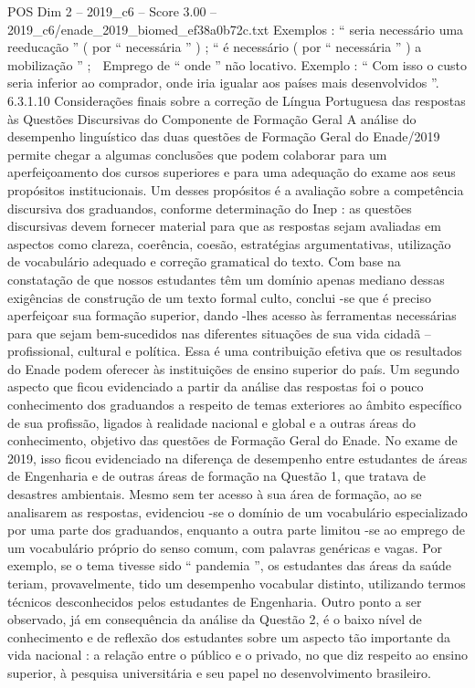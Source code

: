 \begin{textsample}{POS Dim 2 – 2019\_c6 – Score 3.00 – 2019\_c6/enade\_2019\_biomed\_ef38a0b72c.txt}
Exemplos : “ seria necessário uma reeducação ” ( por “ necessária ” ) ; “ é necessário ( por “ necessária ” ) a mobilização ” ;  Emprego de “ onde ” não locativo.
Exemplo : “ Com isso o custo seria inferior ao comprador, onde iria igualar aos países mais desenvolvidos ”. 6.3.1.10 Considerações finais sobre a correção de Língua Portuguesa das respostas às Questões Discursivas do Componente de Formação Geral A análise do desempenho linguístico das duas questões de Formação Geral do Enade/2019 permite chegar a algumas conclusões que podem colaborar para um aperfeiçoamento dos cursos superiores e para uma adequação do exame aos seus propósitos institucionais.
Um desses propósitos é a avaliação sobre a competência discursiva dos graduandos, conforme determinação do Inep : as questões discursivas devem fornecer material para que as respostas sejam avaliadas em aspectos como clareza, coerência, coesão, estratégias argumentativas, utilização de vocabulário adequado e correção gramatical do texto.
Com base na constatação de que nossos estudantes têm um domínio apenas mediano dessas exigências de construção de um texto formal culto, conclui -se que é preciso aperfeiçoar sua formação superior, dando -lhes acesso às ferramentas necessárias para que sejam bem-sucedidos nas diferentes situações de sua vida cidadã – profissional, cultural e política.
Essa é uma contribuição efetiva que os resultados do Enade podem oferecer às instituições de ensino superior do país.
Um segundo aspecto que ficou evidenciado a partir da análise das respostas foi o pouco conhecimento dos graduandos a respeito de temas exteriores ao âmbito específico de sua profissão, ligados à realidade nacional e global e a outras áreas do conhecimento, objetivo das questões de Formação Geral do Enade.
No exame de 2019, isso ficou evidenciado na diferença de desempenho entre estudantes de áreas de Engenharia e de outras áreas de formação na Questão 1, que tratava de desastres ambientais.
Mesmo sem ter acesso à sua área de formação, ao se analisarem as respostas, evidenciou -se o domínio de um vocabulário especializado por uma parte dos graduandos, enquanto a outra parte limitou -se ao emprego de um vocabulário próprio do senso comum, com palavras genéricas e vagas.
Por exemplo, se o tema tivesse sido “ pandemia ”, os estudantes das áreas da saúde teriam, provavelmente, tido um desempenho vocabular distinto, utilizando termos técnicos desconhecidos pelos estudantes de Engenharia.
Outro ponto a ser observado, já em consequência da análise da Questão 2, é o baixo nível de conhecimento e de reflexão dos estudantes sobre um aspecto tão importante da vida nacional : a relação entre o público e o privado, no que diz respeito ao ensino superior, à pesquisa universitária e seu papel no desenvolvimento brasileiro.

\end{textsample}
